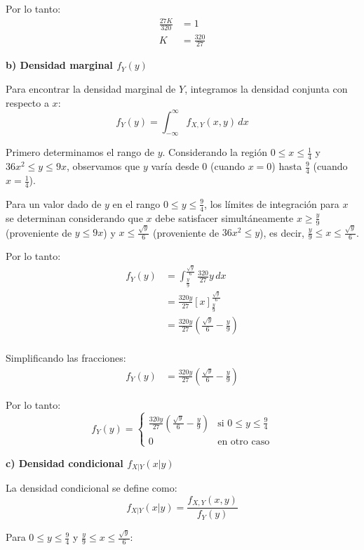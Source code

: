 \documentclass[11pt,a4paper]{article}
\begin{document}
Por lo tanto:
\begin{align*}
\frac{27K}{320} &= 1 \\
K &= \frac{320}{27}
\end{align*}

\textbf{b) Densidad marginal $f_Y(y)$}

Para encontrar la densidad marginal de $Y$, integramos la densidad conjunta con respecto a $x$:
\[
f_Y(y) = \int_{-\infty}^{\infty} f_{X,Y}(x,y) \, dx
\]

Primero determinamos el rango de $y$. Considerando la región $0 \leq x \leq \frac{1}{4}$ y $36x^2 \leq y \leq 9x$, observamos que $y$ varía desde $0$ (cuando $x = 0$) hasta $\frac{9}{4}$ (cuando $x = \frac{1}{4}$).

Para un valor dado de $y$ en el rango $0 \leq y \leq \frac{9}{4}$, los límites de integración para $x$ se determinan considerando que $x$ debe satisfacer simultáneamente $x \geq \frac{y}{9}$ (proveniente de $y \leq 9x$) y $x \leq \frac{\sqrt{y}}{6}$ (proveniente de $36x^2 \leq y$), es decir, $\frac{y}{9} \leq x \leq \frac{\sqrt{y}}{6}$.

Por lo tanto:
\begin{align*}
f_Y(y) &= \int_{\frac{y}{9}}^{\frac{\sqrt{y}}{6}} \frac{320}{27} y \, dx \\
&= \frac{320y}{27} \left[ x \right]_{\frac{y}{9}}^{\frac{\sqrt{y}}{6}} \\
&= \frac{320y}{27} \left( \frac{\sqrt{y}}{6} - \frac{y}{9} \right) \\
\end{align*}

Simplificando las fracciones:
\begin{align*}
f_Y(y) &= \frac{320y}{27} \left( \frac{\sqrt{y}}{6} - \frac{y}{9} \right)
\end{align*}

Por lo tanto:
\[
f_Y(y) = \begin{cases}
    \frac{320y}{27} \left( \frac{\sqrt{y}}{6} - \frac{y}{9} \right) & \text{si } 0 \leq y \leq \frac{9}{4} \\
0 & \text{en otro caso}
\end{cases}
\]

\textbf{c) Densidad condicional $f_{X|Y}(x|y)$}

La densidad condicional se define como:
\[
f_{X|Y}(x|y) = \frac{f_{X,Y}(x,y)}{f_Y(y)}
\]

Para $0 \leq y \leq \frac{9}{4}$ y $\frac{y}{9} \leq x \leq \frac{\sqrt{y}}{6}$:
\end{document}
